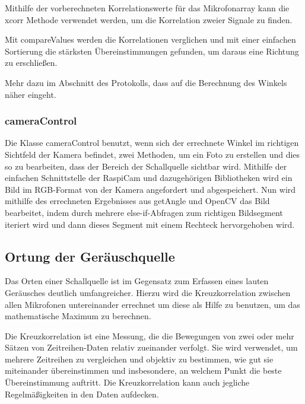 Mithilfe der vorberechneten Korrelationswerte für das Mikrofonarray kann die xcorr Methode verwendet werden, um die Korrelation zweier Signale zu finden.

Mit compareValues werden die Korrelationen verglichen und mit einer einfachen Sortierung die stärksten Übereinstimmungen gefunden, um daraus eine Richtung zu erschließen.

Mehr dazu im Abschnitt des Protokolls, dass auf die Berechnung des Winkels näher eingeht.

\subsubsection{cameraControl}

Die Klasse cameraControl benutzt, wenn sich der errechnete Winkel im richtigen Sichtfeld der Kamera befindet, zwei Methoden, um ein Foto zu erstellen und dies so zu bearbeiten, dass der Bereich der Schallquelle sichtbar wird. Mithilfe der einfachen Schnittstelle der RaspiCam und dazugehörigen Bibliotheken wird ein Bild im RGB-Format von der Kamera angefordert und abgespeichert. Nun wird mithilfe des errechneten Ergebnisses aus getAngle und OpenCV das Bild bearbeitet, indem durch mehrere else-if-Abfragen zum richtigen Bildsegment iteriert wird und dann dieses Segment mit einem Rechteck hervorgehoben wird.


\subsection{Ortung der Geräuschquelle}

Das Orten einer Schallquelle ist im Gegensatz zum Erfassen eines lauten Geräusches deutlich umfangreicher. Hierzu wird die Kreuzkorrelation zwischen allen Mikrofonen untereinander errechnet um diese als Hilfe zu benutzen, um das mathematische Maximum zu berechnen.

Die Kreuzkorrelation ist eine Messung, die die Bewegungen von zwei oder mehr Sätzen von Zeitreihen-Daten relativ zueinander verfolgt. Sie wird verwendet, um mehrere Zeitreihen zu vergleichen und objektiv zu bestimmen, wie gut sie miteinander übereinstimmen und insbesondere, an welchem Punkt die beste Übereinstimmung auftritt. Die Kreuzkorrelation kann auch jegliche Regelmäßigkeiten in den Daten aufdecken.

